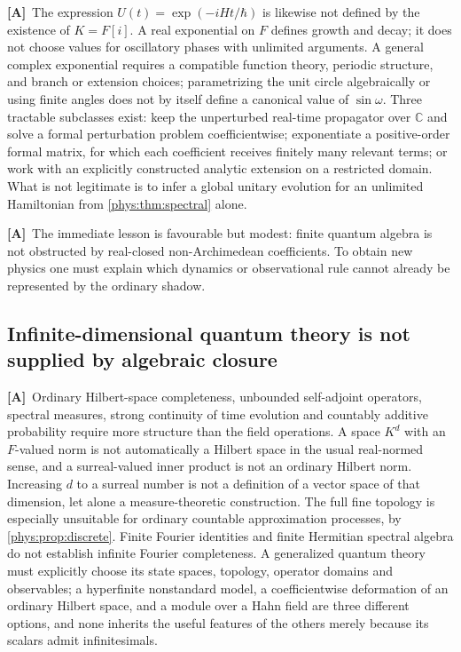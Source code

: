 \documentclass[11pt,letterpaper]{article}
\numberwithin{equation}{section}
\theoremstyle{definition}
\theoremstyle{remark}
\newcommand{\C}{\mathbb C}
\newcommand{\TA}{\textcolor{TierA}{\textsf{\bfseries[A]}}}
\begin{document}
\TA\ The expression $U(t)=\exp(-iHt/\hbar)$ is likewise not defined by the
existence of $K=F[i]$. A real exponential on $F$ defines growth and decay; it
does not choose values for oscillatory phases with unlimited arguments. A
general complex exponential requires a compatible function theory, periodic
structure, and branch or extension choices; parametrizing the unit circle
algebraically or using finite angles does not by itself define a canonical
value of $\sin\omega$. Three tractable subclasses exist: keep the unperturbed
real-time propagator over $\C$ and solve a formal perturbation problem
coefficientwise; exponentiate a positive-order formal matrix, for which each
coefficient receives finitely many relevant terms; or work with an explicitly
constructed analytic extension on a restricted domain. What is not legitimate
is to infer a global unitary evolution for an unlimited Hamiltonian from
\cref{phys:thm:spectral} alone.

\TA\ The immediate lesson is favourable but modest: finite quantum algebra is
not obstructed by real-closed non-Archimedean coefficients. To obtain new
physics one must explain which dynamics or observational rule cannot already be
represented by the ordinary shadow.

\subsection{Infinite-dimensional quantum theory is not supplied by algebraic
closure}
\label{phys:sub:infdim}

\TA\ Ordinary Hilbert-space completeness, unbounded self-adjoint operators,
spectral measures, strong continuity of time evolution and countably additive
probability require more structure than the field operations. A space $K^{d}$
with an $F$-valued norm is not automatically a Hilbert space in the usual
real-normed sense, and a surreal-valued inner product is not an ordinary
Hilbert norm. Increasing $d$ to a surreal number is not a definition of a
vector space of that dimension, let alone a measure-theoretic construction. The
full fine topology is especially unsuitable for ordinary countable
approximation processes, by \cref{phys:prop:discrete}. Finite Fourier
identities and finite Hermitian spectral algebra do not establish infinite
Fourier completeness. A generalized quantum theory must explicitly choose its
state spaces, topology, operator domains and observables; a hyperfinite
nonstandard model, a coefficientwise deformation of an ordinary Hilbert space,
and a module over a Hahn field are three different options, and none inherits
the useful features of the others merely because its scalars admit
infinitesimals.
\end{document}
